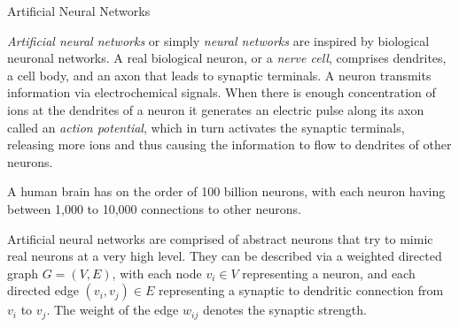 
\date{Chapter 25: Neural Networks}

\begin{frame}
\titlepage
\end{frame}

%
\begin{frame}{Artificial Neural Networks}

{\em Artificial neural networks} or simply {\em neural networks} are
inspired by biological neuronal networks. A real biological neuron, or a
{\em nerve cell}, comprises dendrites, a cell body, and an axon that leads
to synaptic terminals. A neuron transmits information via electrochemical
signals. When there is enough concentration of ions at the dendrites of a
neuron it generates an electric pulse along its axon called an {\em action
potential}, which in turn activates the synaptic terminals, releasing more
ions and thus causing the information to flow to dendrites of other
neurons. 

\medskip

A human brain has on the order of 100 billion neurons, with each
neuron having between 1,000 to 10,000 connections to other neurons. %
%

\medskip

Artificial neural networks are comprised of abstract neurons that try
to mimic real neurons at a very high level. They can be described via a
weighted directed graph $G=(V,E)$, with each node $v_i \in V$ representing
a neuron, and each directed edge $(v_i, v_j) \in E$ representing a synaptic
to dendritic connection from $v_i$ to $v_j$. The weight of the edge $w_{ij}$
denotes the synaptic strength. %
\end{frame}

